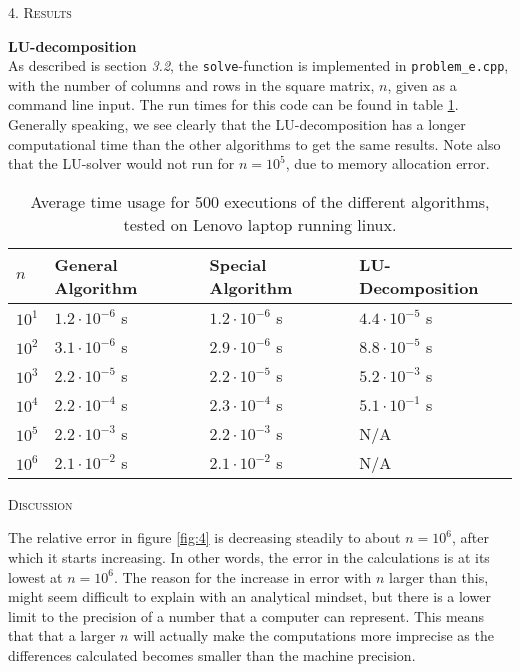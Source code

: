 \documentclass[a4paper,10pt]{article}
\begin{document}
\bigskip

\begin{center}
\textsc{4. Results}
\end{center}
 \textbf{LU-decomposition} \\
As described is section \textit{3.2}, the \texttt{solve}-function is implemented in \texttt{problem\_e.cpp}, with the number of columns and rows in the square matrix, $n$, given as a command line input. The run times for this code can be found in table \ref{tab:LUres}. Generally speaking, we see clearly that the LU-decomposition has a longer computational time than the other algorithms to get the same results. Note also that the LU-solver would not run for $n = 10^5$, due to memory allocation error.


\begin{table}[]
\begin{tabular}{llll}
\hline
\hline
$n$ &General Algorithm  & Special Algorithm & LU-Decomposition \\
\hline
$10^1$ & $1.2\cdot 10^{-6}$ s & $1.2\cdot 10^{-6}$ s & $4.4\cdot 10^{-5}$ s\\
$10^2$ & $3.1\cdot 10^{-6}$ s & $2.9\cdot 10^{-6}$ s & $8.8\cdot 10^{-5}$ s\\
$10^3$ & $2.2\cdot 10^{-5}$ s & $2.2\cdot 10^{-5}$ s & $5.2\cdot 10^{-3}$ s\\
$10^4$ & $2.2\cdot 10^{-4}$ s & $2.3\cdot 10^{-4}$ s & $5.1\cdot 10^{-1}$ s\\
$10^5$ & $2.2\cdot 10^{-3}$ s & $2.2\cdot 10^{-3}$ s & N/A               \\
$10^6$ & $2.1\cdot 10^{-2}$ s & $2.1\cdot 10^{-2}$ s & N/A
\end{tabular}
\caption{Average time usage for 500 executions of the different algorithms, tested on Lenovo laptop running linux.}
\label{tab:LUres}
\end{table}
\bigskip
\begin{center}
\textsc{Discussion}
\end{center}

The relative error in figure \ref{fig:4} is decreasing steadily to about $n = 10^6$, after which it starts increasing. In other words, the error in the calculations is at its lowest at $n=10^6$. The reason for the increase in error with $n$ larger than this, might seem difficult to explain with an analytical mindset, but there is a lower limit to the precision of a number that a computer can represent. This means that that a larger $n$ will actually make the computations more imprecise as the differences calculated becomes smaller than the machine precision. \\
\end{document}
